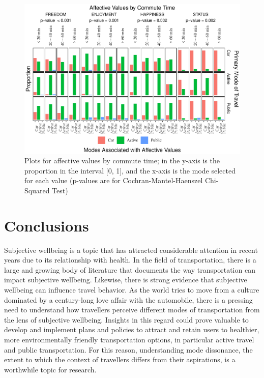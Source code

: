 \documentclass[]{elsarticle} %
\makeatletter
\def\maxwidth{\ifdim\Gin@nat@width>\linewidth\linewidth
\else\Gin@nat@width\fi}
\let\Oldincludegraphics\includegraphics
\renewcommand{\includegraphics}[1]{\Oldincludegraphics[width=\maxwidth]{#1}}
\makeatother
\begin{document}
\begin{figure}
\centering
\includegraphics{Dissonance_Santiago_v2_files/figure-latex/figure-bar-plots-by-attribute-and-travel-time-1.pdf}
\caption{\label{fig:bar-plots-by-travel-time}Plots for affective values
by commute time; in the y-axis is the proportion in the interval {[}0,
1{]}, and the x-axis is the mode selected for each value (p-values are
for Cochran-Mantel-Haenszel Chi-Squared Test)}
\end{figure}

\hypertarget{conclusions}{%
\section{Conclusions}\label{conclusions}}

Subjective wellbeing is a topic that has attracted considerable
attention in recent years due to its relationship with health. In the
field of transportation, there is a large and growing body of literature
that documents the way transportation can impact subjective wellbeing.
Likewise, there is strong evidence that subjective wellbeing can
influence travel behavior. As the world tries to move from a culture
dominated by a century-long love affair with the automobile, there is a
pressing need to understand how travellers perceive different modes of
transportation from the lens of subjective wellbeing. Insights in this
regard could prove valuable to develop and implement plans and policies
to attract and retain users to healthier, more environmentally friendly
transportation options, in particular active travel and public
transportation. For this reason, understanding mode dissonance, the
extent to which the context of travellers differs from their
aspirations, is a worthwhile topic for research.
\end{document}
